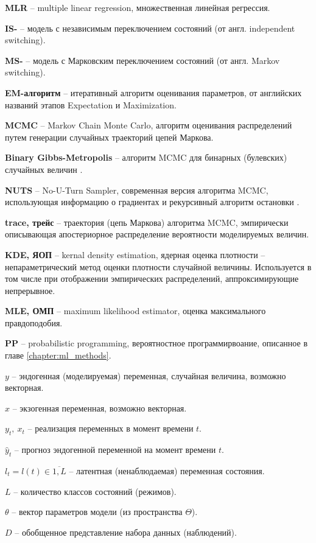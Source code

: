 \documentclass[a4paper,14pt]{extreport}
\begin{document}
\textbf{MLR} -- multiple linear regression, множественная линейная регрессия.

\textbf{IS-} -- модель с независимым переключением состояний (от англ. independent switching).

\textbf{MS-} -- модель с Марковским переключением состояний (от англ. Markov switching).

\textbf{EM-алгоритм} -- итеративный алгоритм оценивания параметров, от английских названий этапов Expectation и Maximization.

\textbf{MCMC} -- Markov Chain Monte Carlo, алгоритм оценивания распределений путем генерации случайных траекторий цепей Маркова.

\textbf{Binary Gibbs-Metropolis} -- алгоритм MCMC для бинарных (булевских) случайных величин \cite{pymc3_2016}.

\textbf{NUTS} -- No-U-Turn Sampler, современная версия алгоритма MCMC, использующая информацию о градиентах и рекурсивный алгоритм остановки \cite{nuts_hoffman_gelman}.

\textbf{trace, трейс} -- траектория (цепь Маркова) алгоритма MCMC, эмпирически описывающая апостериорное распределение вероятности моделируемых величин.

\textbf{KDE, ЯОП} -- kernal density estimation, ядерная оценка плотности -- непараметрический метод оценки плотности случайной величины. Используется в том числе при отображении эмпирических распределений, аппроксимирующие непрерывное.

\textbf{MLE, ОМП} -- maximum likelihood estimator, оценка максимального правдоподобия.

\textbf{PP} -- probabilistic programming, вероятностное программирвоание, описанное в главе \ref{chapter:ml_methods}.

$y$ -- эндогенная (моделируемая) переменная, случайная величина, возможно векторная.

$x$ -- экзогенная переменная, возможно векторная.

$y_t, \: x_t$ -- реализация переменных в момент времени $t$.

$\hat{y}_t$ -- прогноз эндогенной переменной на момент времени $t$.

$l_t = l(t) \in \overline{1,L}$ -- латентная (ненаблюдаемая) переменная состояния.

$L$ -- количество классов состояний (режимов).

$\theta$ -- вектор параметров модели (из пространства $\Theta$).

$D$ -- обобщенное представление набора данных (наблюдений).
\end{document}
